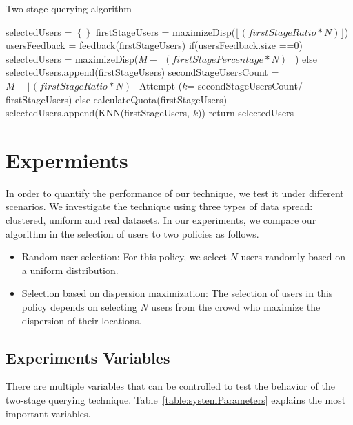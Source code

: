 \documentclass{acm_proc_article-sp}
\newcommand\floor[1]{\lfloor#1\rfloor}
\begin{document}
\begin{algorithm}
\caption{Two-stage querying algorithm}
\label{CHalgorithm}
\begin{algorithmic}[1]
\State selectedUsers = $\left\{\right\}$
\State firstStageUsers = maximizeDisp($\floor{(firstStageRatio*N)}$)
\State usersFeedback = feedback(firstStageUsers)
\State if(usersFeedback.size ==0) 
\State     selectedUsers = maximizeDisp($M -\floor{(firstStagePercentage*N)}$ ){}
\State else {
\State selectedUsers.append(firstStageUsers)
\State  secondStageUsersCount = $M -  \floor{(firstStageRatio*N)}$
\State  Attempt ($k$= secondStageUsersCount/ firstStageUsers)
\State else     calculateQuota(firstStageUsers)
\State selectedUsers.append(KNN(firstStageUsers, $k$))
\State return selectedUsers} 
\EndProcedure
\end{algorithmic}
\end{algorithm}



\cite{adults}
\section{Expermients}
In order to quantify the performance of our technique, we test it under different scenarios. We investigate the technique using three types of data spread: clustered, uniform and real datasets. In our experiments, we compare our algorithm in the selection of users to two policies as follows.
\begin{itemize}
\item Random user selection: For this policy, we select $N$ users randomly based on a uniform distribution.
\item Selection based on dispersion maximization: The selection of users in this policy depends on selecting $N$ users from the crowd who maximize the dispersion of their locations.
\end{itemize}
\subsection{Experiments Variables}
There are multiple variables that can be controlled to test the behavior of the two-stage querying technique. Table~\ref{table:systemParameters} explains the most important variables.
\end{document}
